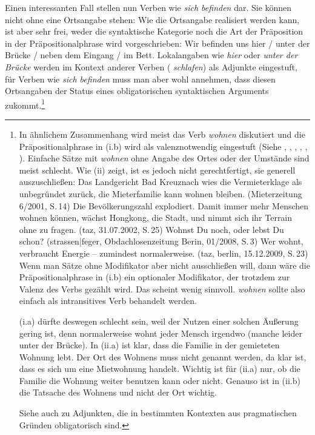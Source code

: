 \noindent
Einen interessanten Fall stellen nun Verben wie \emph{sich befinden} dar. Sie können
nicht ohne eine Ortsangabe stehen:
\z
Wie die Ortsangabe realisiert werden kann, ist aber sehr frei, weder die syntaktische
Kategorie noch die Art der Präposition %
in der Präpositionalphrase wird vorgeschrieben:
\ea
Wir befinden uns hier / unter der Brücke / neben dem Eingang / im Bett.
\z
Lokalangaben wie \emph{hier} oder \emph{unter der Brücke} werden im Kontext anderer Verben (\zb
\emph{schlafen}) als Adjunkte eingestuft, für Verben wie \emph{sich befinden} muss man aber wohl
annehmen, dass diesen Ortsangaben der Status eines obligatorischen syntaktischen Arguments zukommt.\footnote{
  In ähnlichem Zusammenhang wird meist das Verb \emph{wohnen} diskutiert und
  die Präpositionalphrase in (i.b) wird als valenznotwendig eingestuft 
  (Siehe \zb {}, , \citet[]{Bierwisch88a-u-kopiert}, , 
, ).
Einfache Sätze mit \emph{wohnen} ohne Angabe des Ortes oder der Umstände sind meist
        schlecht. 
\eal
{}
\zl
Wie (ii) zeigt, ist es jedoch nicht gerechtfertigt, sie generell auszuschließen:
        \eal
        \ex Das Landgericht Bad Kreuznach wies die Vermieterklage als unbegründet zurück,
            die Mieterfamilie kann wohnen bleiben. (Mieterzeitung 6/2001, S.\,14)
        \ex Die Bevölkerungszahl explodiert. Damit immer mehr Menschen wohnen können, wächst Hongkong, die Stadt, 
            und nimmt sich ihr Terrain ohne zu fragen.  (taz, 31.07.2002, S.\,25)
        \ex Wohnst Du noch, oder lebst Du schon? (strassen|feger, Obdachlosenzeitung Berin, 01/2008,
        S.\,3)%
\ex Wer wohnt, verbraucht Energie -- zumindest normalerweise. (taz, berlin, 15.12.2009, S.\,23)
        \zl
Wenn man Sätze ohne Modifikator aber nicht ausschließen will, dann wäre
die Präpositionalphrase in (i.b) ein optionaler Modifikator, der trotzdem
zur Valenz des Verbs gezählt wird. Das scheint wenig sinnvoll. \emph{wohnen}
sollte also einfach als intransitives Verb behandelt werden.

(i.a) dürfte deswegen schlecht sein, weil der Nutzen einer solchen Äußerung gering ist,
denn normalerweise wohnt jeder Mensch irgendwo (manche leider unter der Brücke).
In (ii.a) ist klar, dass die Familie in der gemieteten Wohnung lebt. Der Ort des Wohnens muss nicht
genannt werden, da klar ist, dass es sich um eine Mietwohnung handelt. Wichtig ist für (ii.a) nur, 
ob die Familie die Wohnung weiter benutzen kann oder nicht.
Genauso ist in (ii.b) die Tatsache des Wohnens und nicht der Ort wichtig.

Siehe auch  zu Adjunkten, die in bestimmten Kontexten aus pragmatischen 
Gründen obligatorisch sind.%
}

